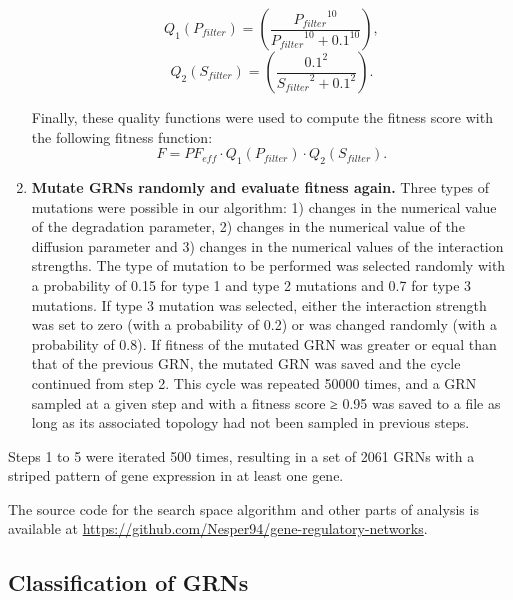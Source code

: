 \documentclass[10pt,letterpaper]{article}
\begin{document}
\begin{enumerate}
 \begin{equation}
  Q_1(P_{filter}) = \left( \frac{ {P_{filter}}^{10} }{ {P_{filter}}^{10} +
  0.1^{10} } \right),
 \end{equation}
 \begin{equation}
  Q_2(S_{filter}) = \left( \frac{ 0.1^2 }{ {S_{filter}}^2 + 0.1^2 } \right).
 \end{equation}

 Finally, these quality functions were used to compute the fitness score with
 the following fitness function:
 \begin{equation}
  F = \mathit{PF_{eff}} \cdot Q_1(P_{filter}) \cdot Q_2(S_{filter}).
 \end{equation}

 \item {\bf Mutate GRNs randomly and evaluate fitness again.} Three types
 of mutations were possible in our algorithm:
1) changes in the numerical value of the degradation parameter, 2) changes
in the numerical value of the diffusion parameter and 3) changes in the
numerical values of the interaction strengths. The type of mutation to be
performed was selected randomly with a probability of 0.15 for type 1 and
type 2 mutations and 0.7 for type 3 mutations. If type 3 mutation was
selected, either the interaction strength was set to zero (with a
probability of 0.2) or was changed randomly (with a probability of 0.8).
If fitness of the mutated GRN was greater or equal than that of the
previous GRN, the mutated GRN was saved and the cycle continued from step 2.
This cycle was repeated 50000 times, and a GRN sampled at a given step
and with a fitness score ≥ 0.95 was saved to a file as
long as its associated topology had not been sampled in previous steps.

\end{enumerate}

Steps 1 to 5 were iterated 500 times, resulting in a set of 2061 GRNs with a
striped pattern of gene expression in at least one gene.

The source code for the search space algorithm and other parts of analysis is
available at \url{https://github.com/Nesper94/gene-regulatory-networks}.

\subsection*{Classification of GRNs}
\end{document}
